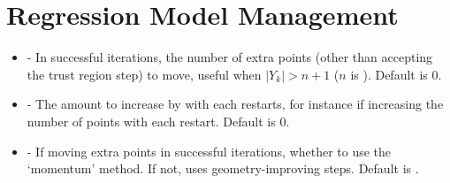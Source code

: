 \documentclass[letterpaper,10pt,english]{sphinxmanual}
\begin{document}
\section{Regression Model Management}
\label{\detokenize{advanced:regression-model-management}}\begin{itemize}
\item {} 
 - In successful iterations, the number of extra points (other than accepting the trust region step) to move, useful when \(|Y_k|>n+1\) (\(n\) is ). Default is 0.

\item {} 
 - The amount to increase  by with each restarts, for instance if increasing the number of points with each restart. Default is 0.

\item {} 
 - If moving extra points in successful iterations, whether to use the ‘momentum’ method. If not, uses geometry-improving steps. Default is .

\end{itemize}
\end{document}
